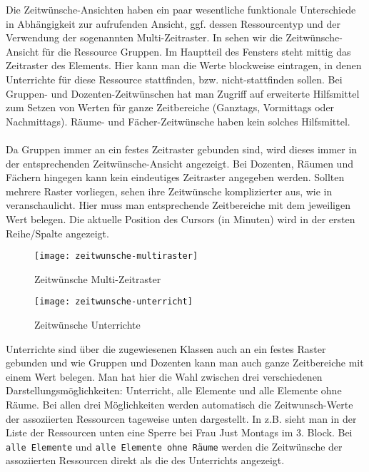 \noindent
Die Zeitwünsche-Ansichten haben ein paar wesentliche funktionale Unterschiede in Abhängigkeit zur aufrufenden Ansicht, ggf. dessen Ressourcentyp und der Verwendung der sogenannten Multi-Zeitraster. In  sehen wir die Zeitwünsche- Ansicht für die Ressource Gruppen. Im Hauptteil des Fensters steht mittig das Zeitraster des Elements. Hier kann man die Werte blockweise eintragen, in denen Unterrichte für diese Ressource stattfinden, bzw. nicht-stattfinden sollen. Bei Gruppen- und Dozenten-Zeitwünschen hat man Zugriff auf erweiterte Hilfsmittel zum Setzen von Werten für ganze Zeitbereiche (Ganztags, Vormittags oder Nachmittags). Räume- und Fächer-Zeitwünsche haben kein solches Hilfsmittel.\\
\\
Da Gruppen immer an ein festes Zeitraster gebunden sind, wird dieses immer in der entsprechenden Zeitwünsche-Ansicht angezeigt. Bei Dozenten, Räumen und Fächern hingegen kann kein eindeutiges Zeitraster angegeben werden. Sollten mehrere Raster vorliegen, sehen ihre Zeitwünsche komplizierter aus, wie in  veranschaulicht. Hier muss man entsprechende Zeitbereiche mit dem jeweiligen Wert belegen. Die aktuelle Position des Cursors (in Minuten) wird in der ersten Reihe/Spalte angezeigt.

\begin{figure}[h]
	\texttt{[image: zeitwunsche-multiraster]}
	\vspace{-15pt}
	\caption{Zeitwünsche Multi-Zeitraster}
	\label{fig:zeitwunsche-multiraster}
\end{figure}

\begin{wrapfigure}{r}{0.3\textwidth}
	\texttt{[image: zeitwunsche-unterricht]}
	\vspace{-15pt}
	\caption{Zeitwünsche Unterrichte}
	\label{fig:zeitwunsche-unterricht}
\end{wrapfigure}

\newpage

\noindent
Unterrichte sind über die zugewiesenen Klassen auch an ein festes Raster gebunden und wie Gruppen und Dozenten kann man auch ganze Zeitbereiche mit einem Wert belegen. Man hat hier die Wahl zwischen drei verschiedenen Darstellungsmöglichkeiten: Unterricht, alle Elemente und alle Elemente ohne Räume. Bei allen drei Möglichkeiten werden automatisch die Zeitwunsch-Werte der assoziierten Ressourcen tageweise unten dargestellt. In  z.B. sieht man in der Liste der Ressourcen unten eine Sperre bei Frau Just Montags im 3. Block. Bei \texttt{alle Elemente} und \texttt{alle Elemente ohne Räume} werden die Zeitwünsche der assoziierten Ressourcen direkt als die des Unterrichts angezeigt. 

